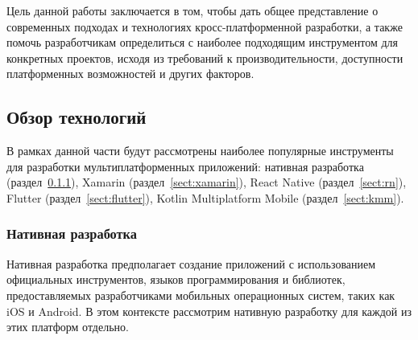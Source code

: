 \documentclass[14pt, russian]{scrartcl}
\begin{document}
Цель данной работы заключается в том, чтобы дать общее представление о современных подходах и технологиях кросс-платформенной разработки, а также помочь разработчикам определиться с наиболее подходящим инструментом для конкретных проектов, исходя из требований к производительности, доступности платформенных возможностей и других факторов.

\subsection{Обзор технологий}\label{sect:review}

В рамках данной части будут рассмотрены наиболее популярные инструменты для разработки мультиплатформенных приложений: нативная разработка (раздел~\ref{sect:native}), Xamarin (раздел~\ref{sect:xamarin}), React Native (раздел~\ref{sect:rn}), Flutter (раздел~\ref{sect:flutter}), Kotlin Multiplatform Mobile (раздел~\ref{sect:kmm}).

\subsubsection{Нативная разработка}\label{sect:native}

Нативная разработка предполагает создание приложений с использованием официальных инструментов, языков программирования и библиотек, предоставляемых разработчиками мобильных операционных систем, таких как iOS и Android. В этом контексте рассмотрим нативную разработку для каждой из этих платформ отдельно.
\end{document}

